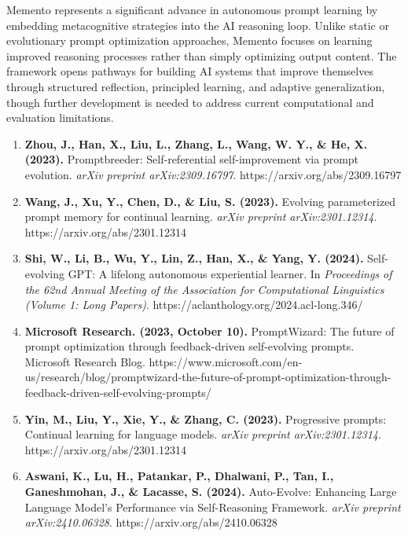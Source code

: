 \documentclass[10pt,a4paper,twocolumn]{article}
\begin{document}
Memento represents a significant advance in autonomous prompt learning by embedding metacognitive strategies into the AI reasoning loop. Unlike static or evolutionary prompt optimization approaches, Memento focuses on learning improved reasoning processes rather than simply optimizing output content. The framework opens pathways for building AI systems that improve themselves through structured reflection, principled learning, and adaptive generalization, though further development is needed to address current computational and evaluation limitations.



\newpage




\begin{enumerate}
    \item 
\textbf{Zhou, J., Han, X., Liu, L., Zhang, L., Wang, W. Y., \& He, X. (2023).} Promptbreeder: Self-referential self-improvement via prompt evolution. \textit{arXiv preprint arXiv:2309.16797}. https://arxiv.org/abs/2309.16797

  \item 
\textbf{Wang, J., Xu, Y., Chen, D., \& Liu, S. (2023).} Evolving parameterized prompt memory for continual learning.  \textit{arXiv preprint arXiv:2301.12314}.  https://arxiv.org/abs/2301.12314

   \item 
\textbf{Shi, W., Li, B., Wu, Y., Lin, Z., Han, X., \& Yang, Y. (2024).} Self-evolving GPT: A lifelong autonomous experiential learner. In \textit{Proceedings of the 62nd Annual Meeting of the Association for Computational Linguistics (Volume 1: Long Papers)}.  https://aclanthology.org/2024.acl-long.346/

  \item 
\textbf{Microsoft Research. (2023, October 10).} PromptWizard: The future of prompt optimization through feedback-driven self-evolving prompts. Microsoft Research Blog.  https://www.microsoft.com/en-us/research/blog/promptwizard-the-future-of-prompt-optimization-through-feedback-driven-self-evolving-prompts/

   \item 
\textbf{Yin, M., Liu, Y., Xie, Y., \& Zhang, C. (2023).} Progressive prompts: Continual learning for language models. \textit{arXiv preprint arXiv:2301.12314}.  https://arxiv.org/abs/2301.12314

  \item 
\textbf{Aswani, K., Lu, H., Patankar, P., Dhalwani, P., Tan, I., Ganeshmohan, J., \& Lacasse, S. (2024).} Auto-Evolve: Enhancing Large Language Model's Performance via Self-Reasoning Framework.  \textit{arXiv preprint arXiv:2410.06328}.  https://arxiv.org/abs/2410.06328


\end{enumerate}
\end{document}
